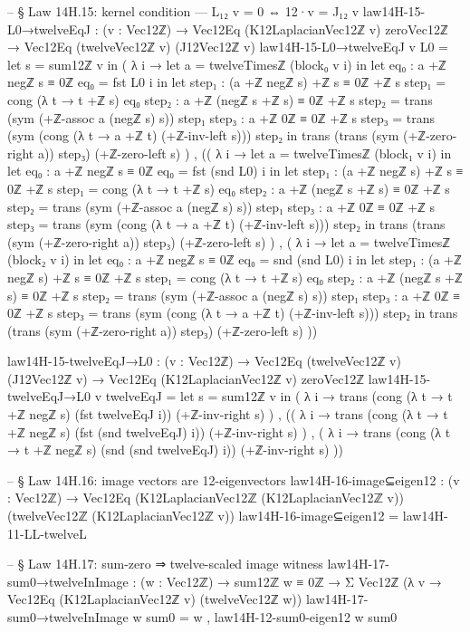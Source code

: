 \documentclass[11pt,a4paper]{book}
\begin{document}
\begin{code}
  -- § Law 14H.15: kernel condition — L₁₂ v = 0 ⇔ 12·v = J₁₂ v
  law14H-15-L0→twelveEqJ : (v : Vec12ℤ) → Vec12Eq (K12LaplacianVec12ℤ v) zeroVec12ℤ → Vec12Eq (twelveVec12ℤ v) (J12Vec12ℤ v)
  law14H-15-L0→twelveEqJ v L0 =
    let s = sum12ℤ v in
    ( λ i →
        let a = twelveTimesℤ (block₀ v i) in
        let eq₀ : a +ℤ negℤ s ≡ 0ℤ
            eq₀ = fst L0 i
        in
        let step₁ : (a +ℤ negℤ s) +ℤ s ≡ 0ℤ +ℤ s
            step₁ = cong (λ t → t +ℤ s) eq₀
            step₂ : a +ℤ (negℤ s +ℤ s) ≡ 0ℤ +ℤ s
            step₂ = trans (sym (+ℤ-assoc a (negℤ s) s)) step₁
            step₃ : a +ℤ 0ℤ ≡ 0ℤ +ℤ s
            step₃ = trans (sym (cong (λ t → a +ℤ t) (+ℤ-inv-left s))) step₂
        in
        trans
          (trans (sym (+ℤ-zero-right a)) step₃)
          (+ℤ-zero-left s)
    ) ,
    (( λ i →
          let a = twelveTimesℤ (block₁ v i) in
          let eq₀ : a +ℤ negℤ s ≡ 0ℤ
              eq₀ = fst (snd L0) i
          in
          let step₁ : (a +ℤ negℤ s) +ℤ s ≡ 0ℤ +ℤ s
              step₁ = cong (λ t → t +ℤ s) eq₀
              step₂ : a +ℤ (negℤ s +ℤ s) ≡ 0ℤ +ℤ s
              step₂ = trans (sym (+ℤ-assoc a (negℤ s) s)) step₁
              step₃ : a +ℤ 0ℤ ≡ 0ℤ +ℤ s
              step₃ = trans (sym (cong (λ t → a +ℤ t) (+ℤ-inv-left s))) step₂
          in
          trans
            (trans (sym (+ℤ-zero-right a)) step₃)
            (+ℤ-zero-left s)
      ) ,
     ( λ i →
          let a = twelveTimesℤ (block₂ v i) in
          let eq₀ : a +ℤ negℤ s ≡ 0ℤ
              eq₀ = snd (snd L0) i
          in
          let step₁ : (a +ℤ negℤ s) +ℤ s ≡ 0ℤ +ℤ s
              step₁ = cong (λ t → t +ℤ s) eq₀
              step₂ : a +ℤ (negℤ s +ℤ s) ≡ 0ℤ +ℤ s
              step₂ = trans (sym (+ℤ-assoc a (negℤ s) s)) step₁
              step₃ : a +ℤ 0ℤ ≡ 0ℤ +ℤ s
              step₃ = trans (sym (cong (λ t → a +ℤ t) (+ℤ-inv-left s))) step₂
          in
          trans
            (trans (sym (+ℤ-zero-right a)) step₃)
            (+ℤ-zero-left s)
      ))

  law14H-15-twelveEqJ→L0 : (v : Vec12ℤ) → Vec12Eq (twelveVec12ℤ v) (J12Vec12ℤ v) → Vec12Eq (K12LaplacianVec12ℤ v) zeroVec12ℤ
  law14H-15-twelveEqJ→L0 v twelveEqJ =
    let s = sum12ℤ v in
    ( λ i →
        trans
          (cong (λ t → t +ℤ negℤ s) (fst twelveEqJ i))
          (+ℤ-inv-right s)
    ) ,
    (( λ i →
          trans
            (cong (λ t → t +ℤ negℤ s) (fst (snd twelveEqJ) i))
            (+ℤ-inv-right s)
      ) ,
     ( λ i →
          trans
            (cong (λ t → t +ℤ negℤ s) (snd (snd twelveEqJ) i))
            (+ℤ-inv-right s)
      ))

  -- § Law 14H.16: image vectors are 12-eigenvectors
  law14H-16-image⊆eigen12 : (v : Vec12ℤ) → Vec12Eq (K12LaplacianVec12ℤ (K12LaplacianVec12ℤ v)) (twelveVec12ℤ (K12LaplacianVec12ℤ v))
  law14H-16-image⊆eigen12 = law14H-11-LL-twelveL

  -- § Law 14H.17: sum-zero ⇒ twelve-scaled image witness
  law14H-17-sum0→twelveInImage : (w : Vec12ℤ) → sum12ℤ w ≡ 0ℤ → Σ Vec12ℤ (λ v → Vec12Eq (K12LaplacianVec12ℤ v) (twelveVec12ℤ w))
  law14H-17-sum0→twelveInImage w sum0 = w , law14H-12-sum0-eigen12 w sum0
\end{code}
\end{document}
